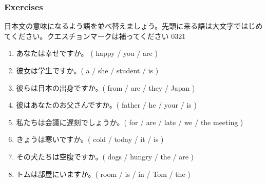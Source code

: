 \documentclass[aspectratio=169,xcolor={dvipsnames,table}]{beamer}
\newcommand{\myaudio}[1]{\href{#1}{\faVolumeUp}}
\begin{document}
\begin{frame}[plain]\frametitle{Exercises}

{\small 日本文の意味になるよう語を並べ替えましょう。先頭に来る語は大文字ではじめてください。クエスチョンマークは補ってください}%
\hfill{\tiny 0321}\,{\scriptsize\myaudio{./audio/008_question_be_06.mp3}}

\begin{enumerate}
  \item あなたは幸せですか。 ( happy / you / are )\hfill{}
  \item 彼女は学生ですか。( a / she / student / is )\hfill{}
  \item 彼らは日本の出身ですか。( from / are / they / Japan )\hfill{}
  \item 彼はあなたのお父さんですか。( father / he / your / is )\hfill{}
  \item 私たちは会議に遅刻でしょうか。( for / are / late / we / the meeting )\\
\hfill{}
  \item きょうは寒いですか。( cold / today / it / is )\hfill{}
  \item その犬たちは空腹ですか。( dogs / hungry / the / are )\hfill{}
  \item トムは部屋にいますか。( room / is / in / Tom / the )
\hfill{}
\end{enumerate}
\end{frame}
\end{document}
